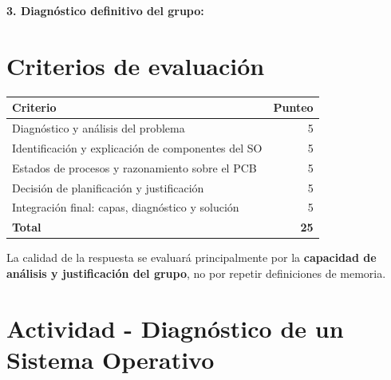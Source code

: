 \documentclass[
  spanish,
  letterpaper,
]{scrbook}
\newcounter{none} %
\begin{document}
\vspace{1.5cm}

\textbf{3. Diagnóstico definitivo del grupo:}

\vspace{1.8cm}


\chapter{Criterios de evaluación}\label{criterios-de-evaluaciuxf3n}

{\def\LTcaptype{none} %
\begin{longtable}[]{@{}lr@{}}
\toprule\noalign{}
Criterio & Punteo \\
\midrule\noalign{}
\endhead
\bottomrule\noalign{}
\endlastfoot
Diagnóstico y análisis del problema & 5 \\
Identificación y explicación de componentes del SO & 5 \\
Estados de procesos y razonamiento sobre el PCB & 5 \\
Decisión de planificación y justificación & 5 \\
Integración final: capas, diagnóstico y solución & 5 \\
\textbf{Total} & \textbf{25} \\
\end{longtable}
}

\begin{tcolorbox}[enhanced jigsaw, arc=.35mm, bottomrule=.15mm, bottomtitle=1mm, breakable, colback=white, colbacktitle=quarto-callout-note-color!10!white, colframe=quarto-callout-note-color-frame, coltitle=black, left=2mm, leftrule=.75mm, opacityback=0, opacitybacktitle=0.6, rightrule=.15mm, title=\textcolor{quarto-callout-note-color}{\faInfo}\hspace{0.5em}{Cierre}, titlerule=0mm, toprule=.15mm, toptitle=1mm]

La calidad de la respuesta se evaluará principalmente por la
\textbf{capacidad de análisis y justificación del grupo}, no por repetir
definiciones de memoria.

\end{tcolorbox}


\chapter{Actividad - Diagnóstico de un Sistema
Operativo}\label{actividad---diagnuxf3stico-de-un-sistema-operativo-1}
\end{document}
